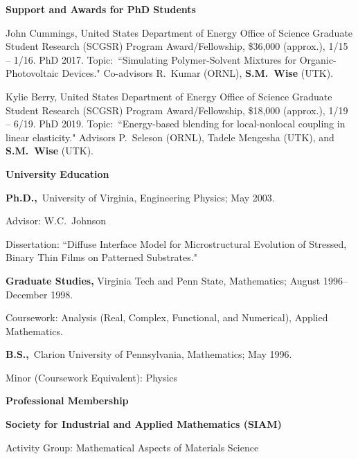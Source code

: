 \documentclass[11pt]{letter}
\begin{document}
	\smallskip
	
{\LARGE\bf Support and Awards for PhD Students}
    \begin{description}
    \item
John Cummings, United States Department of Energy Office of Science Graduate Student Research (SCGSR) Program Award/Fellowship, \$36,000 (approx.), 1/15 -- 1/16. PhD 2017.  Topic:~``Simulating Polymer-Solvent Mixtures for Organic-Photovoltaic Devices." Co-advisors R.~Kumar (ORNL), \textbf{S.M.~Wise} (UTK).
    \item
Kylie Berry, United States Department of Energy Office of Science Graduate Student Research (SCGSR) Program Award/Fellowship, \$18,000 (approx.), 1/19 -- 6/19. PhD 2019.  Topic:~``Energy-based blending for local-nonlocal coupling in linear elasticity." Advisors P.~Seleson (ORNL), Tadele Mengesha (UTK), and \textbf{S.M.~Wise} (UTK).
	\end{description}
	
	\smallskip
  
{\LARGE\bf  University Education}
    \begin{description}
    \item
\textbf{Ph.D.,}~University of Virginia, Engineering Physics; May 2003.
    \begin{description}
    \item
Advisor: W.C.~Johnson
    \item
Dissertation: ``Diffuse Interface Model for Microstructural Evolution of Stressed, Binary Thin Films on Patterned Substrates."
    \end{description}
    \item
 \textbf{Graduate Studies,} Virginia Tech and Penn State, Mathematics; August 1996--December 1998.
    \begin{description}
    \item
Coursework: Analysis (Real, Complex, Functional, and Numerical), Applied Mathematics.
    \end{description}
    \item
\textbf{B.S.,}~Clarion University of Pennsylvania, Mathematics; May
1996.
    \begin{description}
    \item
Minor (Coursework Equivalent): Physics
    \end{description}
    \end{description}
	
	\smallskip
  
{\LARGE\bf  Professional Membership}
    \begin{description}
    \item
 \textbf{Society for Industrial and Applied Mathematics (SIAM)}
    \begin{description}
    \item
Activity Group: Mathematical Aspects of Materials Science
    \end{description}
    \end{description}
	
\end{document}
